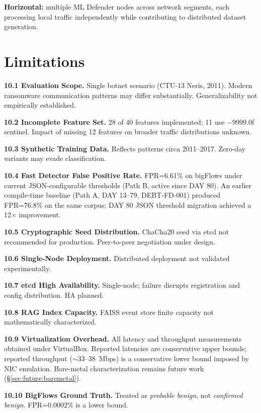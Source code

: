 \documentclass[11pt,a4paper]{article}
\begin{document}
\textbf{Horizontal:} multiple ML Defender nodes across network segments, each processing
local traffic independently while contributing to distributed dataset generation.

\section{Limitations}
\label{sec:limitations}

\textbf{10.1 Evaluation Scope.} Single botnet scenario (CTU-13 Neris, 2011). Modern
ransomware communication patterns may differ substantially. Generalizability not empirically
established.

\textbf{10.2 Incomplete Feature Set.} 28 of 40 features implemented; 11 use $-9999.0$f
sentinel. Impact of missing 12 features on broader traffic distributions unknown.

\textbf{10.3 Synthetic Training Data.} Reflects patterns circa 2011--2017. Zero-day
variants may evade classification.

\textbf{10.4 Fast Detector False Positive Rate.} FPR=6.61\% on bigFlows under current
JSON-configurable thresholds (Path B, active since DAY 80). An earlier compile-time baseline
(Path A, DAY 13--79, DEBT-FD-001) produced FPR=76.8\% on the same corpus; DAY 80 JSON
threshold migration achieved a 12$\times$ improvement.

\textbf{10.5 Cryptographic Seed Distribution.} ChaCha20 seed via etcd not recommended for
production. Peer-to-peer negotiation under design.

\textbf{10.6 Single-Node Deployment.} Distributed deployment not validated
experimentally.

\textbf{10.7 etcd High Availability.} Single-node; failure disrupts registration and config
distribution. HA planned.

\textbf{10.8 RAG Index Capacity.} FAISS event store finite capacity not mathematically
characterized.

\textbf{10.9 Virtualization Overhead.} All latency and throughput measurements obtained
under VirtualBox. Reported latencies are conservative upper bounds; reported throughput
(${\sim}$33--38~Mbps) is a conservative lower bound imposed by NIC emulation. Bare-metal
characterization remains future work (\S\ref{sec:future:baremetal}).

\textbf{10.10 BigFlows Ground Truth.} Treated as \emph{probable benign}, not
\emph{confirmed benign}. FPR=0.0002\% is a lower bound.
\end{document}
